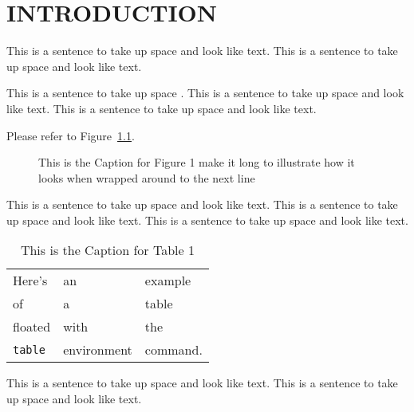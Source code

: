  
\chapter{INTRODUCTION}
 
This is a sentence to take up space and look like text.
This is a sentence to take up space and look like text.
 
This is a sentence to take up space \cite{wright2002racism}.
This is a sentence to take up space and look like text.
This is a sentence to take up space and look like text.

Please refer to Figure~\ref{myfig}.  %

\begin{figure}
\centering
\vspace{2.0in} %
\caption{This is the Caption for Figure 1 make it long to illustrate
how it looks when wrapped around to the next line}
\label{myfig}  %
\end{figure}

This is a sentence to take up space and look like text.
This is a sentence to take up space and look like text.
This is a sentence to take up space and look like text.
 
\begin{table}
\caption[This is the Caption for Table 1]
            {This is the Caption for Table 1\cite{thisbook}}
\begin{center}
\begin{tabular}{lll}
Here's       & an          & example  \\
of           & a           & table    \\
floated      & with        & the      \\
\verb+table+ & environment & command.
\end{tabular}
\end{center}
\end{table}
 
This is a sentence to take up space and look like text.
This is a sentence to take up space and look like text.
 
